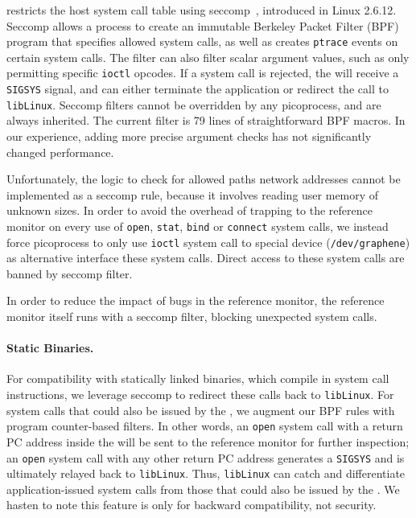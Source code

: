 \sysname{} restricts the host system call table 
using seccomp~\citep{seccomp}, introduced in Linux 2.6.12.
Seccomp allows a process to create an immutable Berkeley Packet Filter (BPF) program
that specifies allowed system calls, as well as creates {\tt ptrace} 
events on certain system calls.
The filter can also filter scalar argument values,
such as only permitting specific {\tt ioctl} opcodes.
If a system call is rejected, the \pal{} will receive a {\tt SIGSYS} signal,
and can either terminate the application or redirect the 
call to {\tt libLinux}.
Seccomp filters cannot be overridden by any picoprocess,
and are always inherited.
The current \sysname{} filter is 79 lines 
of straightforward BPF macros.  In our experience, adding more precise argument checks
has not significantly changed performance.


Unfortunately, the logic to check for allowed paths network addresses cannot be implemented 
as a seccomp rule, because it involves reading user memory of unknown sizes. 
In order to avoid the overhead of trapping to the reference monitor on 
every use of {\tt open}, {\tt stat}, {\tt bind} or {\tt connect} system calls, we instead 
force picoprocess to only use {\tt ioctl} system call to \sysname{} special device ({\tt /dev/graphene}) as alternative interface these system calls. Direct access to these system calls are banned by seccomp filter.

In order to reduce the impact of bugs in the reference monitor,
the reference monitor itself runs with a seccomp filter,
blocking unexpected system calls.

\paragraph{Static Binaries.} 
For compatibility with statically linked binaries, which 
compile in system call instructions,
we leverage seccomp to redirect these calls 
back to {\tt libLinux}.  
For system calls that could also be issued by the \pal{},
we augment our BPF rules with program counter-based filters.
In other words, an {\tt open} system call with a return PC address inside the \pal{} 
will be sent to the reference monitor for further inspection;
an {\tt open} system call with any other return PC address generates 
a {\tt SIGSYS} and is ultimately relayed back to {\tt libLinux}.
Thus, {\tt libLinux} can catch and differentiate application-issued system calls
from those that could also be issued by the \pal{}.
We hasten to note this feature is only for backward compatibility,
not security. 


